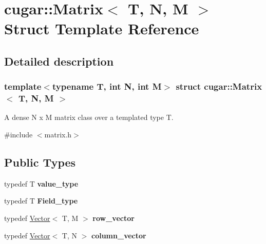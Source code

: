 \hypertarget{structcugar_1_1_matrix}{}\section{cugar\+:\+:Matrix$<$ T, N, M $>$ Struct Template Reference}
\label{structcugar_1_1_matrix}


\subsection{Detailed description}
\subsubsection*{template$<$typename T, int N, int M$>$\newline
struct cugar\+::\+Matrix$<$ T, N, M $>$}

A dense N x M matrix class over a templated type T. 

{\ttfamily \#include $<$matrix.\+h$>$}

\subsection*{Public Types}
\begin{DoxyCompactItemize}
\item 
\mbox{\label{structcugar_1_1_matrix_a0ec419ed1a1ae2989cb39a9a060aa850}} 
typedef T {\bfseries value\+\_\+type}
\item 
\mbox{\label{structcugar_1_1_matrix_acc5c830b148636a3e3326f08c7174779}} 
typedef T {\bfseries Field\+\_\+type}
\item 
\mbox{\label{structcugar_1_1_matrix_a2b689b1bc5deff43a5294a00f0a46045}} 
typedef \hyperlink{structcugar_1_1_vector}{Vector}$<$ T, M $>$ {\bfseries row\+\_\+vector}
\item 
\mbox{\label{structcugar_1_1_matrix_a3dac399315d7b57b7d725143bdd1fc91}} 
typedef \hyperlink{structcugar_1_1_vector}{Vector}$<$ T, N $>$ {\bfseries column\+\_\+vector}
\end{DoxyCompactItemize}
